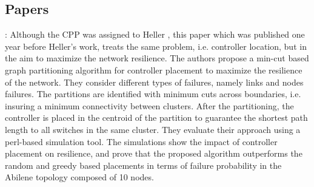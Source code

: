 \documentclass[a4paper,10pt]{article}
\begin{document}


\subsection{Papers}
\cite{ZhBe11}: Although the CPP was assigned to Heller \cite{HeSh12}, this paper which was published one year before Heller's work, treats the same problem, i.e. controller location, but in the aim to maximize the network resilience. The authors propose a min-cut based graph partitioning algorithm for controller placement to maximize the resilience of the network. They consider different types of failures, namely links and nodes failures. The partitions are identified with minimum cuts across boundaries, i.e. insuring a minimum connectivity between clusters. After the partitioning, the controller is placed in the centroid of the partition to guarantee the shortest path length to all switches in the same cluster. They evaluate their approach using a perl-based simulation tool. The simulations show the impact of controller placement on resilience, and prove that the proposed algorithm outperforms the random and greedy based placements in terms of failure probability in the Abilene topology composed of 10 nodes. 
\end{document}
